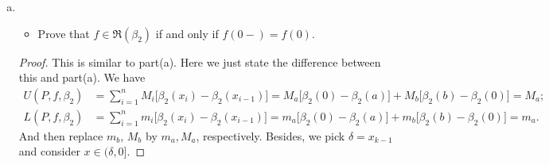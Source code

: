 \begin{Exercise}
\begin{enumerate}[(a)]
		\begin{itemize}
			\item $\int f\,d\beta_1 = f(0)$ under the hypothesis.
		\end{itemize}
		\begin{proof}
			By definition, we know
			$$
			L(P,f,\beta_1) \leq \int f\,d\beta_1 \leq U(P,f,\beta_1).
			$$
			We follow the notations from previous arguments.
			Thus we have
			\begin{align*}
			U(P,f,\beta_1) &= M_b \geq f(0); \\
			L(P,f,\beta_1) &= m_b \leq f(0).
			\end{align*}
			Given $\epsilon > 0$, it follows that
			\begin{align*}
			f(0)-\int f\,d\beta_1 \leq U(P,f,\beta_1) - L(P,f,\beta_1) < \epsilon; \\
			\int f\,d\beta_1-f(0) \leq U(P,f,\beta_1) - L(P,f,\beta_1) < \epsilon.
			\end{align*}
			Hence
			$$
			\left| \int f\,d\beta_1-f(0) \right| < \epsilon.
			$$
			Since $\epsilon$ was arbitrary, we conclude
			$$
			\int f\,d\beta_1 = f(0)
			$$
			as desired.
		\end{proof}
		
		\item
		\begin{itemize}
			\item Prove that $f\in \mathfrak{R}(\beta_2)$ if and only if $f(0-) = f(0)$.
		\end{itemize}
		\begin{proof}
			This is similar to part(a). Here we just state the difference between this and part(a). 
			We have
			\begin{align*}
			U(P,f,\beta_2)
			&= \sum_{i=1}^{n}M_i \big[ \beta_2(x_i) - \beta_2(x_{i-1}) \big]
			= M_a \big[ \beta_2(0) - \beta_2(a) \big] + M_b \big[ \beta_2(b) - \beta_2(0) \big]
			= M_a; \\
			L(P,f,\beta_2)
			&= \sum_{i=1}^{n}m_i \big[ \beta_2(x_i) - \beta_2(x_{i-1}) \big]
			= m_a \big[ \beta_2(0) - \beta_2(a) \big] + m_b \big[ \beta_2(b) - \beta_2(0) \big]
			= m_a.
			\end{align*}
			And then replace $m_b$, $M_b$ by $m_a, M_a$, respectively.
			Besides, we pick $\delta = x_{k-1}$ and consider $x\in (\delta, 0]$.
		\end{proof}
		

\end{enumerate}
\end{Exercise}
